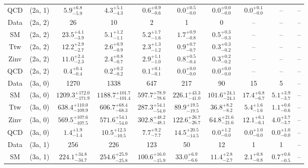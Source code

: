 \begin{table}[h!]
{\begin{tabular}{cccccccccc}
	QCD & (2a, 1) & $5.9^{+ 6.8 }_{- 5.9 }$ & $4.3^{+ 5.1 }_{- 4.3 }$ & $0.6^{+ 0.9 }_{- 0.6 }$ & $0.0^{+ 0.5 }_{- 0.0 }$ & $0.0^{+ 0.0 }_{- 0.0 }$ & $0.0^{+ 0.1 }_{- 0.0 }$ & -- & -- \\[0.5ex] 
	Data & (2a, 2) & 26 & 10 & 2 & 1 & 0 & -- & -- & -- \\[0.5ex] 
	SM & (2a, 2) & $23.5^{+ 4.1 }_{- 3.9 }$ & $5.1^{+ 1.2 }_{- 1.1 }$ & $5.2^{+ 1.7 }_{- 1.6 }$ & $1.7^{+ 0.9 }_{- 0.8 }$ & $0.5^{+ 0.3 }_{- 0.3 }$ & -- & -- & -- \\[0.5ex] 
	Ttw & (2a, 2) & $12.2^{+ 2.9 }_{- 2.7 }$ & $2.6^{+ 0.9 }_{- 0.9 }$ & $2.3^{+ 1.3 }_{- 1.2 }$ & $0.9^{+ 0.7 }_{- 0.7 }$ & $0.3^{+ 0.3 }_{- 0.2 }$ & -- & -- & -- \\[0.5ex] 
	Zinv & (2a, 2) & $11.0^{+ 2.4 }_{- 2.3 }$ & $2.4^{+ 0.8 }_{- 0.7 }$ & $2.9^{+ 1.1 }_{- 1.0 }$ & $0.8^{+ 0.5 }_{- 0.4 }$ & $0.3^{+ 0.2 }_{- 0.2 }$ & -- & -- & -- \\[0.5ex] 
	QCD & (2a, 2) & $0.4^{+ 0.4 }_{- 0.4 }$ & $0.2^{+ 0.2 }_{- 0.2 }$ & $0.1^{+ 0.1 }_{- 0.1 }$ & $0.0^{+ 0.0 }_{- 0.0 }$ & $0.0^{+ 0.0 }_{- 0.0 }$ & -- & -- & -- \\[0.5ex] 
	Data & (3a, 0) & 1270 & 1338 & 647 & 217 & 90 & 15 & 5 & -- \\[0.5ex] 
	SM & (3a, 0) & $1209.3^{+ 172.0 }_{- 171.9 }$ & $1188.7^{+ 101.7 }_{- 101.4 }$ & $597.7^{+ 78.9 }_{- 78.6 }$ & $226.1^{+ 43.3 }_{- 41.0 }$ & $101.6^{+ 24.1 }_{- 24.1 }$ & $17.4^{+ 6.8 }_{- 6.7 }$ & $5.1^{+ 3.9 }_{- 3.7 }$ & -- \\[0.5ex] 
	Ttw & (3a, 0) & $638.4^{+ 110.0 }_{- 109.9 }$ & $606.7^{+ 68.4 }_{- 68.3 }$ & $287.3^{+ 54.1 }_{- 54.0 }$ & $89.9^{+ 19.5 }_{- 19.5 }$ & $36.8^{+ 8.2 }_{- 8.2 }$ & $5.4^{+ 1.6 }_{- 1.6 }$ & $1.1^{+ 0.6 }_{- 0.6 }$ & -- \\[0.5ex] 
	Zinv & (3a, 0) & $569.5^{+ 107.6 }_{- 107.5 }$ & $571.6^{+ 54.1 }_{- 54.0 }$ & $302.8^{+ 48.2 }_{- 48.1 }$ & $122.6^{+ 26.7 }_{- 26.7 }$ & $64.8^{+ 21.6 }_{- 21.6 }$ & $12.1^{+ 6.1 }_{- 6.1 }$ & $4.0^{+ 3.7 }_{- 3.7 }$ & -- \\[0.5ex] 
	QCD & (3a, 0) & $1.4^{+ 1.9 }_{- 1.4 }$ & $10.5^{+ 12.3 }_{- 10.5 }$ & $7.7^{+ 9.2 }_{- 7.7 }$ & $14.5^{+ 20.5 }_{- 14.5 }$ & $0.0^{+ 1.2 }_{- 0.0 }$ & $0.0^{+ 1.0 }_{- 0.0 }$ & $0.0^{+ 1.0 }_{- 0.0 }$ & -- \\[0.5ex] 
	Data & (3a, 1) & 256 & 226 & 123 & 50 & 12 & 1 & 1 & -- \\[0.5ex] 
	SM & (3a, 1) & $224.1^{+ 34.8 }_{- 34.7 }$ & $254.6^{+ 25.9 }_{- 25.8 }$ & $100.6^{+ 16.0 }_{- 15.9 }$ & $33.0^{+ 6.9 }_{- 6.6 }$ & $11.4^{+ 2.8 }_{- 2.7 }$ & $2.1^{+ 0.8 }_{- 0.8 }$ & $0.7^{+ 0.6 }_{- 0.5 }$ & -- \\[0.5ex] 

\end{tabular}}
\end{table}
